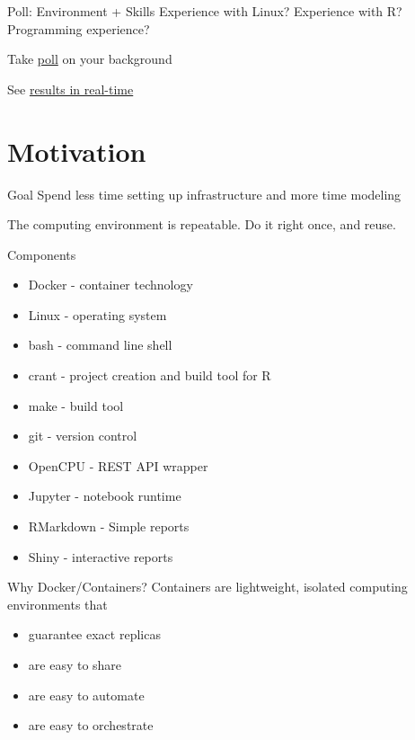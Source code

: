 \documentclass{beamer}
\begin{document}
\begin{frame}{Poll: Environment + Skills}
Experience with Linux?
Experience with R?
Programming experience?

Take \href{}{poll} on your background

See \href{}{results in real-time}
\end{frame}



\section{Motivation}

\begin{frame}{Goal}
\alert{Spend less time setting up infrastructure and more time modeling}

The computing environment is repeatable. Do it right once, and reuse.
\end{frame}

\begin{frame}{Components}
\begin{itemize}
\item Docker - container technology
\item Linux - operating system
\item bash - command line shell
\item crant - project creation and build tool for R
\item make - build tool
\item git - version control
\item OpenCPU - REST API wrapper
\item Jupyter - notebook runtime
\item RMarkdown - Simple reports
\item Shiny - interactive reports
\end{itemize}
\end{frame}


\begin{frame}{Why Docker/Containers?}
Containers are lightweight, isolated computing environments that
\begin{itemize}
\item guarantee exact replicas
\item are easy to share
\item are easy to automate
\item are easy to orchestrate
\end{itemize}
\end{frame}
\end{document}
